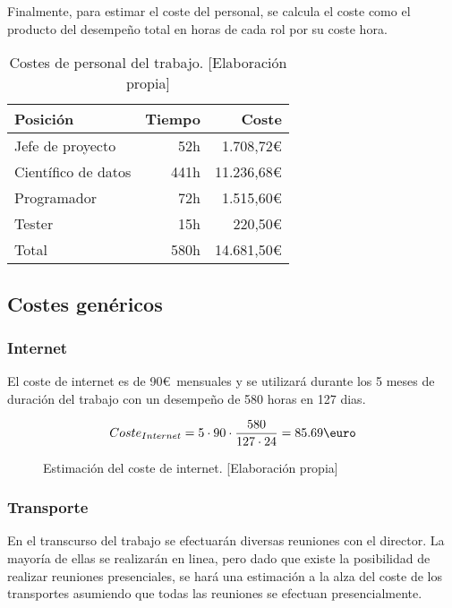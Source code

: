 Finalmente, para estimar el coste del personal, se calcula el coste como el producto del desempeño
total en horas de cada rol por su coste hora.

\begin{table}[ht]
    \begin{center}
        \begin{tabular}{ l r r }
         Posición & Tiempo & Coste \\
         \hline
         Jefe de proyecto & 52h & 1.708,72\euro \\
         Científico de datos & 441h & 11.236,68\euro \\
         Programador & 72h & 1.515,60\euro \\
         Tester & 15h & 220,50\euro \\
         \hline
         Total & 580h & 14.681,50\euro
        \end{tabular}
        \caption{Costes de personal del trabajo. [Elaboración propia]}\label{rolcosttable}
    \end{center}
\end{table}


\subsection{Costes genéricos}\label{costesgenericos}
\subsubsection{Internet} El coste de internet es de 90\euro\ mensuales y se utilizará durante los 5 meses de
duración del trabajo con un desempeño de 580 horas en 127 dias.
\begin{figure}[ht]
    \begin{align*}
        Coste_{Internet} = 5 \cdot 90 \cdot \frac{580}{127 \cdot 24} = 85.69\text{\euro}
    \end{align*}
    \caption{Estimación del coste de internet.  [Elaboración propia]}
\end{figure}

\subsubsection{Transporte} En el transcurso del trabajo se efectuarán diversas reuniones con el director. La mayoría de ellas
se realizarán en linea, pero dado que existe la posibilidad de realizar reuniones presenciales, se hará una estimación
a la alza del coste de los transportes asumiendo que todas las reuniones se efectuan presencialmente.

